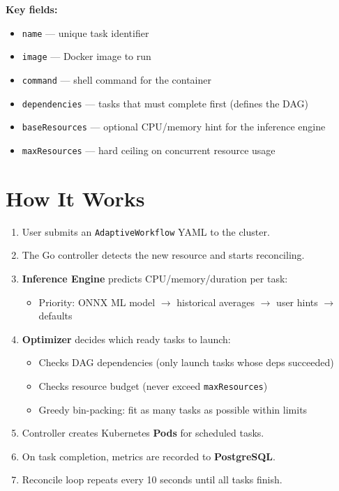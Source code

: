 \documentclass[11pt,a4paper]{article}
\begin{document}
\textbf{Key fields:}
\begin{itemize}[leftmargin=2em]
  \item \texttt{name} --- unique task identifier
  \item \texttt{image} --- Docker image to run
  \item \texttt{command} --- shell command for the container
  \item \texttt{dependencies} --- tasks that must complete first (defines the DAG)
  \item \texttt{baseResources} --- optional CPU/memory hint for the inference engine
  \item \texttt{maxResources} --- hard ceiling on concurrent resource usage
\end{itemize}

\section{How It Works}

\begin{enumerate}[leftmargin=2em]
  \item User submits an \texttt{AdaptiveWorkflow} YAML to the cluster.
  \item The Go controller detects the new resource and starts reconciling.
  \item \textbf{Inference Engine} predicts CPU/memory/duration per task:
    \begin{itemize}
      \item Priority: ONNX ML model $\to$ historical averages $\to$ user hints $\to$ defaults
    \end{itemize}
  \item \textbf{Optimizer} decides which ready tasks to launch:
    \begin{itemize}
      \item Checks DAG dependencies (only launch tasks whose deps succeeded)
      \item Checks resource budget (never exceed \texttt{maxResources})
      \item Greedy bin-packing: fit as many tasks as possible within limits
    \end{itemize}
  \item Controller creates Kubernetes \textbf{Pods} for scheduled tasks.
  \item On task completion, metrics are recorded to \textbf{PostgreSQL}.
  \item Reconcile loop repeats every 10 seconds until all tasks finish.
\end{enumerate}
\end{document}
